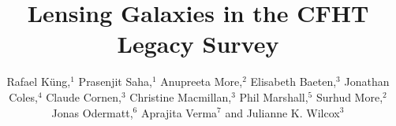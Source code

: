 \documentclass{ws-procs975x65}
\begin{document}
\title{Lensing Galaxies in the CFHT Legacy Survey}

\author{
Rafael Küng,$^{1}$
Prasenjit Saha,$^{1}$
Anupreeta More,$^{2}$
Elisabeth Baeten,$^{3}$
Jonathan Coles,$^{4}$
Claude Cornen,$^{3}$
Christine Macmillan,$^{3}$
Phil Marshall,$^{5}$ 
Surhud More,$^{2}$
Jonas Odermatt,$^{6}$
Aprajita Verma$^{7}$
and Julianne K. Wilcox$^{3}$
}

\address{
$^{1}$Physik-Institut, University of Zurich, Winterthurerstrasse 190, 8057 Zurich, Switzerland\\
$^{2}$Kavli Institute for the Physics and Mathematics of the Universe, University of Tokyo, 5-1-5 Kashiwanoha, Kashiwa-shi 277-8583, Japan\\
$^{3}$Zooniverse, c/o Astrophysics Department, University of Oxford, Oxford OX1 3RH, UK \\
$^{4}$Exascale Research Computing Lab, Campus Teratec, 2 Rue de la Piquetterie, 91680 Bruyeres-le-Chatel, France\\
$^{5}$Kavli Institute for Particle Astrophysics and Cosmology, Stanford University, 452 Lomita Mall, Stanford, CA 94035, USA\\
$^{6}$Kantonsschule Zug, L\"ussiweg 24, 6300 Zug, Switzerland\\
$^{7}$Sub-department of Astrophysics, University of Oxford, Denys Wilkinson Building, Keble Road, Oxford, OX1 3RH, UK
}


% 
% 
% 
\end{document}
